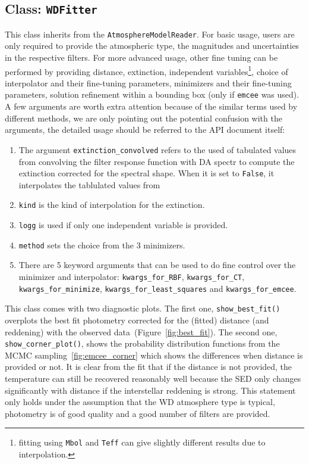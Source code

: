 \documentclass[fleqn,usenatbib]{rasti}
\begin{document}
\subsection{Class: \texttt{WDFitter}}
This class inherits from the \verb+AtmosphereModelReader+. For basic usage,
users are only required to provide the atmospheric type, the magnitudes and
uncertainties in the respective filters. For more advanced usage, other
fine tuning can be performed by providing distance, extinction, independent
variables\footnote{fitting using \verb+Mbol+ and \verb+Teff+ can give slightly
different results due to interpolation.}, choice of interpolator and their
fine-tuning parameters, minimizers and their fine-tuning parameters,
solution refinement within a bounding box (only if \verb+emcee+ was used).
A few arguments are worth extra attention because of the similar terms used
by different methods, we are only pointing out the potential confusion with
the arguments, the detailed usage should be referred to the API document
itself:
\begin{enumerate}
    \item The argument \verb+extinction_convolved+ refers to the used of
    tabulated values from convolving the filter response function with DA
    spectr to compute the extinction corrected for the spectral shape.
    When it is set to \verb+False+, it interpolates the tablulated values
    from \citet{2011ApJ...737..103S}
    \item \verb+kind+ is the kind of interpolation for the extinction.
    \item \verb+logg+ is used if only one independent variable is
    provided.
    \item \verb+method+ sets the choice from the 3 minimizers.
    \item There are 5 keyword arguments that can be used to do fine 
    control over the minimizer and interpolator: \verb+kwargs_for_RBF+,
    \verb+kwargs_for_CT+, \verb+kwargs_for_minimize+,
    \verb+kwargs_for_least_squares+ and \verb+kwargs_for_emcee+.
\end{enumerate}

This class comes with two diagnostic plots. The first one,
\verb+show_best_fit()+ overplots the best fit photometry corrected for the
(fitted) distance (and reddening) with the observed
data~(Figure~\ref{fig:best_fit}). The second one, \verb+show_corner_plot()+,
shows the probability distribution functions from the MCMC
sampling~\ref{fig:emcee_corner} which shows the differences when distance
is provided or not. It is clear from the fit that if the distance is not
provided, the temperature can still be recovered reasonably well because
the SED only changes significantly with distance if the interstellar
reddening is strong. This statement only holds under the assumption that
the WD atmosphere type is typical, photometry is of good quality and a
good number of filters are provided.
\end{document}

